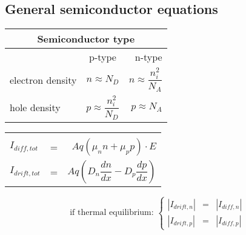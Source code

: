 \documentclass{article}
\begin{document}
\subsection*{General semiconductor equations}
\begin{minipage}[t]{0.5\linewidth}
\vspace{0pt}
\setlength{\fboxsep}{0pt}
\setlength{\fboxrule}{0.5pt}
\hfill
\begin{minipage}[t]{0.7\linewidth}
\vspace{0pt}
\centering
\begin{tabular}{lcr}
    \multicolumn{3}{c}{Semiconductor type} \\
    \toprule
    & p-type & n-type \\
    \midrule
    electron density & $n\approx N_D$ & $n\approx\dfrac{n_i^2}{N_A}$ \\[0.4cm]
    hole density     & $p\approx\dfrac{n_i^2}{N_D}$ & $p\approx N_A$ \\[0.4cm]
    \bottomrule
\end{tabular}
\end{minipage}

\begin{minipage}[t]{\textwidth}
\vspace{16pt}
\centering
\begin{tabular}{lcr}
    \toprule
    \\[-8pt]
    $I_{diff,tot}$ &=& $Aq(\mu_n n+\mu_p p)\cdot E$ \\[0.4cm]
    $I_{drift,tot}$ &=& $Aq\left(D_n\dfrac{dn}{dx}-D_p\dfrac{dp}{dx}\right)$ \\[0.4cm]
    \bottomrule
\end{tabular}
\vspace{10pt}
$$
\mbox{if thermal equilibrium: }
\left\{
\begin{array}{rcl}
|I_{drift,n}|&=&|I_{diff,n}| \\[0.4cm]
|I_{drift,p}|&=&|I_{diff,p}|
\end{array}
\right.
$$
\end{minipage}
\end{minipage}
\end{document}
